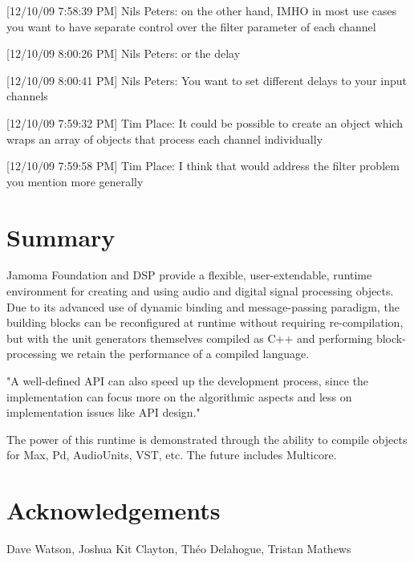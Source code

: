 \documentclass[twoside,10pt]{article}
\begin{document}
[12/10/09 7:58:39 PM] Nils Peters: on the other hand, IMHO in most use cases you want to have separate control over the filter parameter of each channel

[12/10/09 8:00:26 PM] Nils Peters: or the delay

[12/10/09 8:00:41 PM] Nils Peters: You want to set different delays to your input channels

[12/10/09 7:59:32 PM] Tim Place: It could be possible to create an object which wraps an array of objects that process each channel individually

[12/10/09 7:59:58 PM] Tim Place: I think that would address the filter problem you mention more generally





\section{Summary} %

Jamoma Foundation and DSP provide a flexible, user-extendable, runtime environment for creating and using audio and digital signal processing objects.  Due to its advanced use of dynamic binding and message-passing paradigm, the building blocks can be reconfigured at runtime without requiring re-compilation, but with the unit generators themselves compiled as C++ and performing block-processing we retain the performance of a compiled language.


"A well-defined API can also speed up the development process, since the implementation can focus more on the algorithmic aspects and less on implementation issues like API design." \cite{Lerch:2005}

The power of this runtime is demonstrated through the ability to compile objects for Max, Pd, AudioUnits, VST, etc.  The future includes Multicore.



\section{Acknowledgements} %

Dave Watson, Joshua Kit Clayton, Th\'eo Delahogue, Tristan Mathews
\end{document}
